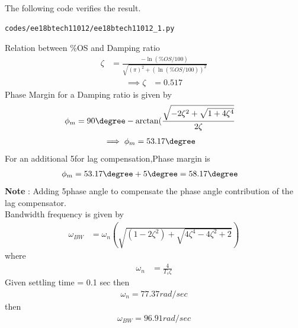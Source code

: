 \begin{enumerate}[label=\thesubsection.\arabic*.,ref=\thesubsection.\theenumi]
The following code verifies the result.
\begin{lstlisting}
codes/ee18btech11012/ee18btech11012_1.py
\end{lstlisting}
%
Relation between \%OS and Damping ratio
\begin{align}
\zeta &= \frac{-\ln(\%OS/100)}{\sqrt{(\pi)^2 + (\ln(\%OS/100))^2}}
\end{align}
\begin{align}
\implies\zeta &= 0.517 
\end{align}
Phase Margin for a Damping ratio is given by
\begin{align}
\phi_{m} &= 90\degree - \arctan(\frac{\sqrt{-2\zeta^2+\sqrt{1+4\zeta^4}}}{2\zeta}
\end{align}
\begin{align}
\implies \phi_{m} &= 53.17\degree
\end{align}
For an additional 5\degree for lag compensation,Phase margin is
\begin{align}
    \phi_{m} &= 53.17\degree + 5\degree= 58.17\degree
\end{align}
\textbf{Note} : Adding 5\degree  phase angle to compensate the phase angle contribution of the lag compensator.\\

Bandwidth frequency is given by\\
\begin{align}
\omega_{BW} &= \omega_{n}(\sqrt{(1-2\zeta^2)+\sqrt{4\zeta^4-4\zeta^2+2}})
\end{align}
where
\begin{align}
    \omega_{n}&=\frac{4}{T_{s}\zeta}
\end{align}
Given settling time = 0.1 sec then 
\begin{align}
    \omega_{n} = 77.37 rad/sec 
\end{align}
then
\begin{align}
    \omega_{BW} = 96.91 rad/sec
\end{align}


\end{enumerate}
